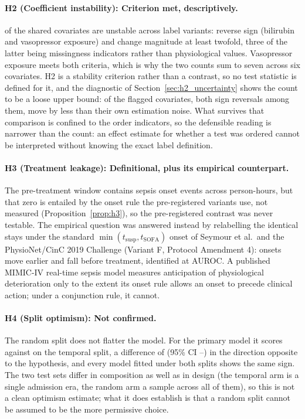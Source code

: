 \paragraph{H2 (Coefficient instability): Criterion met, descriptively.}
\pcHTwoEst{} of the \pcHTwoNTerms{} shared covariates are unstable across label
variants: \pcHTwoNSign{} reverse sign (bilirubin and vasopressor exposure) and
\pcHTwoNMag{} change magnitude at least twofold, three of the latter being
missingness indicators rather than physiological values. Vasopressor exposure
meets both criteria, which is why the two counts sum to seven across six
covariates. H2 is a stability criterion rather than a contrast, so no test
statistic is defined for it, and the diagnostic of
Section~\ref{sec:h2_uncertainty} shows the count to be a loose upper bound:
\pcHTwoNNoise{} of the \pcHTwoNFlagged{} flagged covariates, both sign
reversals among them, move by less than their own estimation noise. What
survives that comparison is confined to the order indicators, so the
defensible reading is narrower than the count: an effect estimate for whether
a test was ordered cannot be interpreted without knowing the exact label
definition.

\paragraph{H3 (Treatment leakage): Definitional, plus its empirical counterpart.}
The pre-treatment window contains \pcPreTreatOnsetsVarB{} sepsis onset events
across \pcPreTreatPersonHoursVarB{} person-hours, but that zero is entailed by
the onset rule the pre-registered variants use, not measured
(Proposition~\ref{prop:h3}), so the pre-registered contrast was never testable.
The empirical question was answered instead by relabelling the identical stays
under the standard $\min(t_{\text{susp}}, t_{\text{SOFA}})$ onset of Seymour et
al.\ and the PhysioNet/CinC 2019 Challenge (Variant F, Protocol Amendment 4):
\pcFNMovedEarlier{} onsets move earlier and \pcPreTreatOnsetsVarF{} fall before
treatment, identified at \pcPreTreatAurocPrimaryF{} AUROC. A published MIMIC-IV
real-time sepsis model measures anticipation of physiological deterioration only
to the extent its onset rule allows an onset to precede clinical action; under a
conjunction rule, it cannot.

\paragraph{H4 (Split optimism): Not confirmed.}
The random split does not flatter the model. For the primary model it scores
\pcAurocRandomPrimaryB{} against \pcAurocPrimaryB{} on the temporal split, a
difference of \pcHFourEst{} (95\% CI \pcHFourCiLo--\pcHFourCiHi) in the
direction opposite to the hypothesis, and every model fitted under both splits
shows the same sign. The two test sets differ in composition as well as in
design (the temporal arm is a single admission era, the random arm a sample
across all of them), so this is not a clean optimism estimate; what it does
establish is that a random split cannot be assumed to be the more permissive
choice.

